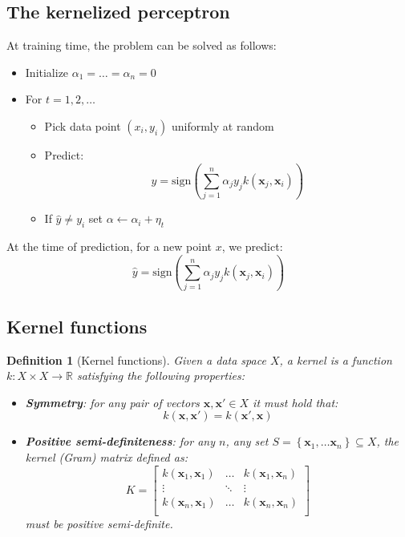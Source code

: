 \documentclass[a4paper,10pt,twoside]{article}
\newtheorem{definition}{Definition}[section]
\begin{document}
\subsection{The kernelized perceptron}
At training time, the problem can be solved as follows:
\begin{itemize}
    \item Initialize $\alpha_1=\ldots=\alpha_n=0$
    \item For $t=1,2,\ldots$
    \begin{itemize}
        \item Pick data point $(x_i, y_i)$ uniformly at random
        \item Predict:
        \begin{equation*}
            \hat{y} = \text{sign}(\sum_{j=1}^{n}\alpha_jy_jk(\mathbf{x}_j, \mathbf{x}_i))
        \end{equation*}
        \item If $\hat{y}\neq y_i$ set $\alpha\leftarrow \alpha_i+\eta_t$
    \end{itemize}
\end{itemize}
At the time of prediction, for a new point $x$, we predict:
\begin{equation*}
    \hat{y} = \text{sign}(\sum_{j=1}^{n}\alpha_jy_jk(\mathbf{x}_j, \mathbf{x}_i))
\end{equation*}
\subsection{Kernel functions}
\begin{definition}[Kernel functions]
    Given a data space $X$, a kernel is a function $k:X\times X\rightarrow\mathbb{R}$ satisfying the following properties:
    \begin{itemize}
        \item \textbf{Symmetry}: for any pair of vectors $\mathbf{x}, \mathbf{x}'\in X$ it must hold that:
        \begin{equation*}
            k(\mathbf{x}, \mathbf{x}')=k(\mathbf{x}', \mathbf{x})
        \end{equation*}
        \item \textbf{Positive semi-definiteness}: for any $n$, any set $S=\left\{\mathbf{x}_1,\ldots\mathbf{x}_n\right\}\subseteq X$, the kernel (Gram) matrix defined as:
        \begin{equation*}
            K = \begin{bmatrix}
                k(\mathbf{x}_1, \mathbf{x}_1) & \ldots & k(\mathbf{x}_1, \mathbf{x}_n)\\
                \vdots & \ddots & \vdots\\
                k(\mathbf{x}_n, \mathbf{x}_1) & \ldots & k(\mathbf{x}_n, \mathbf{x}_n)\\
            \end{bmatrix}
        \end{equation*}
        must be positive semi-definite.
    \end{itemize}
\end{definition}
\end{document}
